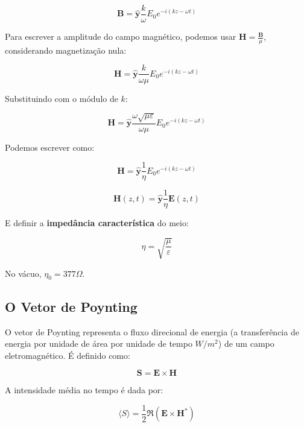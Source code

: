 \documentclass[12pt,a4paper]{report}
\begin{document}
\begin{equation}
    \textbf{B}=\hat{\textbf{y}}\frac{k}{\omega}E_0e^{-i(kz-\omega t)}
\end{equation}

Para escrever a amplitude do campo magnético, podemos usar $\textbf{H}=\frac{\textbf{B}}{\mu}$, considerando magnetização nula:

\begin{equation}
    \textbf{H}=\hat{\textbf{y}}\frac{k}{\omega\mu}E_0e^{-i(kz-\omega t)}
\end{equation}

Substituindo com o módulo de $k$:

\begin{equation}
    \textbf{H}=\hat{\textbf{y}}\frac{\omega\sqrt{\mu\varepsilon}}{\omega\mu}E_0e^{-i(kz-\omega t)}
\end{equation}

Podemos escrever como:

\begin{equation}
    \textbf{H}=\hat{\textbf{y}}\frac{1}{\eta}E_0e^{-i(kz-\omega t)}
\end{equation}

\begin{equation}
    \textbf{H}(z,t)=\hat{\textbf{y}}\frac{1}{\eta}\textbf{E}(z,t)
\end{equation}

E definir a \textbf{impedância característica} do meio:

\begin{equation}
    \eta=\sqrt{\frac{\mu}{\varepsilon}}
\end{equation}

No vácuo, $\eta_0=377\Omega$.

\subsection{O Vetor de Poynting}

O vetor de Poynting representa o fluxo direcional de energia (a transferência de energia por unidade de área por unidade de tempo $W/m^2$) de um campo eletromagnético. É definido como:

\begin{equation}
    \textbf{S}=\textbf{E}\times\textbf{H}
\end{equation}

A intensidade média no tempo é dada por:

\begin{equation}
    \langle S \rangle = \frac{1}{2}\Re(\textbf{E}\times\textbf{H}^*)
\end{equation}
\end{document}
